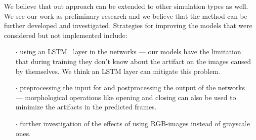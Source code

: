 \documentclass{llncs}
\begin{document}
We believe that out approach can be extended to other simulation types as well. We see our work as preliminary research and we believe that the method can be further developed and investigated. Strategies for improving the models that were considered but not implemented include:
\begin{itemize}
\item[$\cdot$] using an LSTM~\cite{lstm} layer in the networks --- our models have the limitation that during training they don't know about the artifact on the images caused by themselves. We think an LSTM layer can mitigate this problem.
\item[$\cdot$] preprocessing the input for and postprocessing the output of the networks --- morphological operations like opening and closing can also be used to minimize the artifacts in the predicted frames.
\item[$\cdot$] further investigation of the effects of using RGB-images instead of grayscale ones.
\end{itemize}
\end{document}
